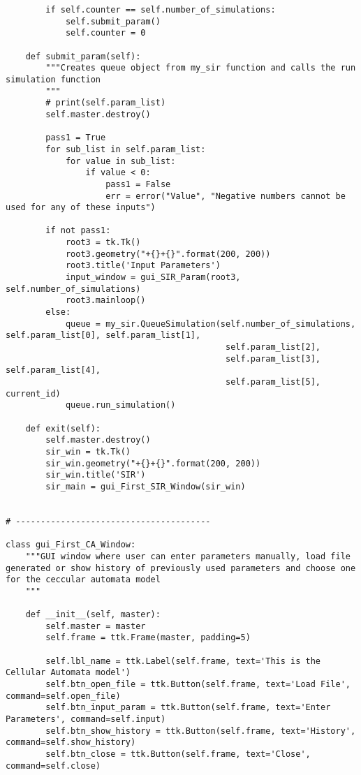 \documentclass[11pt, a4paper]{article}
\begin{document}
\begin{lstlisting}
        if self.counter == self.number_of_simulations:
            self.submit_param()
            self.counter = 0

    def submit_param(self):
        """Creates queue object from my_sir function and calls the run simulation function
        """
        # print(self.param_list)
        self.master.destroy()

        pass1 = True
        for sub_list in self.param_list:
            for value in sub_list:
                if value < 0:
                    pass1 = False
                    err = error("Value", "Negative numbers cannot be used for any of these inputs")

        if not pass1:
            root3 = tk.Tk()
            root3.geometry("+{}+{}".format(200, 200))
            root3.title('Input Parameters')
            input_window = gui_SIR_Param(root3, self.number_of_simulations)
            root3.mainloop()
        else:
            queue = my_sir.QueueSimulation(self.number_of_simulations, self.param_list[0], self.param_list[1],
                                            self.param_list[2],
                                            self.param_list[3], self.param_list[4],
                                            self.param_list[5], current_id)
            queue.run_simulation()

    def exit(self):
        self.master.destroy()
        sir_win = tk.Tk()
        sir_win.geometry("+{}+{}".format(200, 200))
        sir_win.title('SIR')
        sir_main = gui_First_SIR_Window(sir_win)


# ---------------------------------------

class gui_First_CA_Window:
    """GUI window where user can enter parameters manually, load file generated or show history of previously used parameters and choose one for the ceccular automata model
    """

    def __init__(self, master):
        self.master = master
        self.frame = ttk.Frame(master, padding=5)

        self.lbl_name = ttk.Label(self.frame, text='This is the Cellular Automata model')
        self.btn_open_file = ttk.Button(self.frame, text='Load File', command=self.open_file)
        self.btn_input_param = ttk.Button(self.frame, text='Enter Parameters', command=self.input)
        self.btn_show_history = ttk.Button(self.frame, text='History', command=self.show_history)
        self.btn_close = ttk.Button(self.frame, text='Close', command=self.close)


\end{lstlisting}
\end{document}
